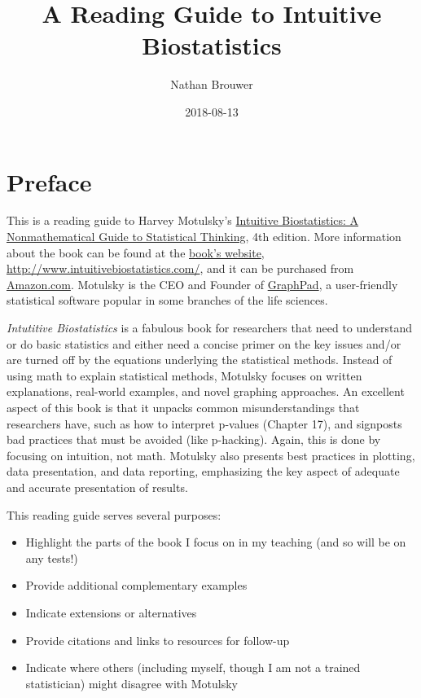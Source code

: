 \documentclass[]{book}
\title{A Reading Guide to Intuitive Biostatistics}
\author{Nathan Brouwer}
\date{2018-08-13}
\providecommand{\tightlist}{%
  \setlength{\itemsep}{0pt}\setlength{\parskip}{0pt}}
\theoremstyle{definition}
\theoremstyle{definition}
\theoremstyle{definition}
\theoremstyle{remark}
\begin{document}
\maketitle

{
\setcounter{tocdepth}{1}
\tableofcontents
}
\chapter*{Preface}\label{preface}

This is a reading guide to Harvey Motulsky's
\href{http://www.intuitivebiostatistics.com/}{Intuitive Biostatistics: A
Nonmathematical Guide to Statistical Thinking}, 4th edition. More
information about the book can be found at the
\href{http://www.intuitivebiostatistics.com/}{book's website},
\url{http://www.intuitivebiostatistics.com/}, and it can be purchased
from
\href{https://www.amazon.com/Intuitive-Biostatistics-Nonmathematical-Statistical-Thinking/dp/0190643560/ref=asap_bc?ie=UTF8}{Amazon.com}.
Motulsky is the CEO and Founder of
\href{https://www.graphpad.com/}{GraphPad}, a user-friendly statistical
software popular in some branches of the life sciences.

\emph{Intutitive Biostatistics} is a fabulous book for researchers that
need to understand or do basic statistics and either need a concise
primer on the key issues and/or are turned off by the equations
underlying the statistical methods. Instead of using math to explain
statistical methods, Motulsky focuses on written explanations,
real-world examples, and novel graphing approaches. An excellent aspect
of this book is that it unpacks common misunderstandings that
researchers have, such as how to interpret p-values (Chapter 17), and
signposts bad practices that must be avoided (like p-hacking). Again,
this is done by focusing on intuition, not math. Motulsky also presents
best practices in plotting, data presentation, and data reporting,
emphasizing the key aspect of adequate and accurate presentation of
results.

This reading guide serves several purposes:

\begin{itemize}
\tightlist
\item
  Highlight the parts of the book I focus on in my teaching (and so will
  be on any tests!)
\item
  Provide additional complementary examples
\item
  Indicate extensions or alternatives
\item
  Provide citations and links to resources for follow-up
\item
  Indicate where others (including myself, though I am not a trained
  statistician) might disagree with Motulsky
\end{itemize}
\end{document}
